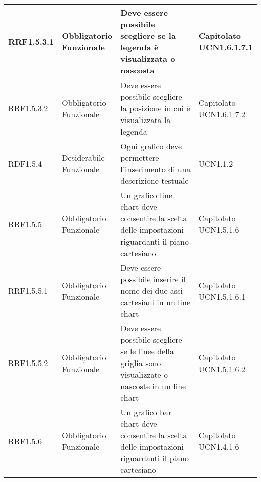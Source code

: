 \begin{longtabu}[c]{|X[0.7,l]|X[l]|X[2.5,l]|X[l]|}
                RRF1.5.3.1 & 
                \parbox[t]{4cm}{ Obbligatorio \\ Funzionale} & Deve essere possibile scegliere se la legenda è visualizzata o nascosta & \parbox[t]{4cm}{Capitolato \\ UCN1.6.1.7.1 }  \\ 
                \hline
                
                RRF1.5.3.2 & 
                \parbox[t]{4cm}{ Obbligatorio \\ Funzionale} & Deve essere possibile scegliere la posizione in cui è visualizzata la legenda & \parbox[t]{4cm}{Capitolato \\ UCN1.6.1.7.2 }  \\ 
                \hline
                
                RDF1.5.4 & 
                \parbox[t]{4cm}{ Desiderabile \\ Funzionale} & Ogni grafico deve permettere l'inserimento di una descrizione testuale & \parbox[t]{4cm}{UCN1.1.2 }  \\ 
                \hline
                
                RRF1.5.5 & 
                \parbox[t]{4cm}{ Obbligatorio \\ Funzionale} & Un grafico line chart deve consentire la scelta delle impostazioni riguardanti il piano cartesiano & \parbox[t]{4cm}{Capitolato \\ UCN1.5.1.6 }  \\ 
                \hline
                
                RRF1.5.5.1 & 
                \parbox[t]{4cm}{ Obbligatorio \\ Funzionale} & Deve essere possibile inserire il nome dei due assi cartesiani in un line chart & \parbox[t]{4cm}{Capitolato \\ UCN1.5.1.6.1 }  \\ 
                \hline
                
                RRF1.5.5.2 & 
                \parbox[t]{4cm}{ Obbligatorio \\ Funzionale} & Deve essere possibile scegliere se le linee della griglia sono visualizzate o nascoste in un line chart & \parbox[t]{4cm}{Capitolato \\ UCN1.5.1.6.2 }  \\ 
                \hline
                
                RRF1.5.6 & 
                \parbox[t]{4cm}{ Obbligatorio \\ Funzionale} & Un grafico bar chart deve consentire la scelta delle impostazioni riguardanti il piano cartesiano & \parbox[t]{4cm}{Capitolato \\ UCN1.4.1.6 }  \\ 
                \hline
                

\end{longtabu}

